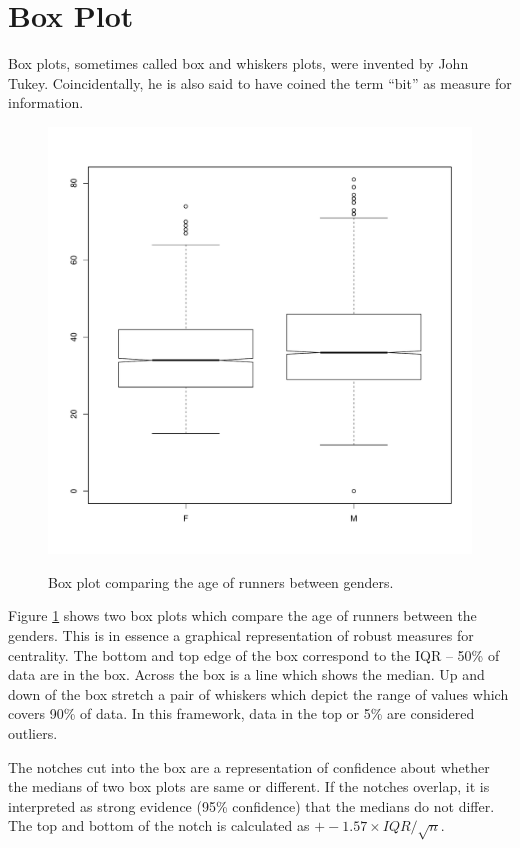 \documentclass{tufte-book} %
\begin{document}
\section{Box Plot}
Box plots\cite{tukey1977}, sometimes called box and whiskers plots, were invented by John Tukey. Coincidentally, he is also said to have coined the term ``bit'' as measure for information. 

\begin{figure}
	\centering
	\includegraphics{graphics/boxplot-age-gender}
	\label{img:boxplot-age-gender}
	\caption{Box plot comparing the age of runners between genders.}
\end{figure}

Figure \ref{img:boxplot-age-gender} shows two box plots which compare the age of runners between the genders. This is in essence a graphical representation of robust measures for centrality. The bottom and top edge of the box correspond to the IQR -- 50\% of data are in the box. Across the box is a line which shows the median. Up and down of the box stretch a pair of whiskers which depict the range of values which covers 90\% of data. In this framework, data in the top or 5\% are considered outliers.

The notches\cite{chambers1983} cut into the box are a representation of confidence about whether the medians of two box plots are same or different. If the notches overlap, it is interpreted as strong evidence (95\% confidence) that the medians do not differ. The top and bottom of the notch is calculated as $+- 1.57 \times IQR /  \sqrt{n}$.
\end{document}
